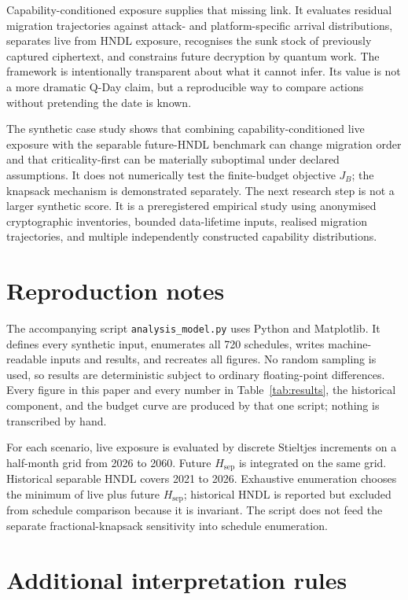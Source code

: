 \documentclass[10pt]{article}
\begin{document}
Capability-conditioned exposure supplies that missing link. It evaluates residual migration trajectories against attack- and platform-specific arrival distributions, separates live from HNDL exposure, recognises the sunk stock of previously captured ciphertext, and constrains future decryption by quantum work. The framework is intentionally transparent about what it cannot infer. Its value is not a more dramatic Q-Day claim, but a reproducible way to compare actions without pretending the date is known.

The synthetic case study shows that combining capability-conditioned live exposure with the separable future-HNDL benchmark can change migration order and that criticality-first can be materially suboptimal under declared assumptions. It does not numerically test the finite-budget objective $J_B$; the knapsack mechanism is demonstrated separately. The next research step is not a larger synthetic score. It is a preregistered empirical study using anonymised cryptographic inventories, bounded data-lifetime inputs, realised migration trajectories, and multiple independently constructed capability distributions.

\appendix
\section{Reproduction notes}

The accompanying script \texttt{analysis\_model.py} uses Python and Matplotlib. It defines every
synthetic input, enumerates all 720 schedules, writes machine-readable inputs and results, and
recreates all figures. No random sampling is used, so results are deterministic subject to
ordinary floating-point differences. Every figure in this paper and every number in
Table~\ref{tab:results}, the historical component, and the budget curve are produced
by that one script; nothing is transcribed by hand.

For each scenario, live exposure is evaluated by discrete Stieltjes increments on a half-month grid from 2026 to 2060. Future $H_{\mathrm{sep}}$ is integrated on the same grid. Historical separable HNDL covers 2021 to 2026. Exhaustive enumeration chooses the minimum of live plus future $H_{\mathrm{sep}}$; historical HNDL is reported but excluded from schedule comparison because it is invariant. The script does not feed the separate fractional-knapsack sensitivity into schedule enumeration.

\section{Additional interpretation rules}
\end{document}
